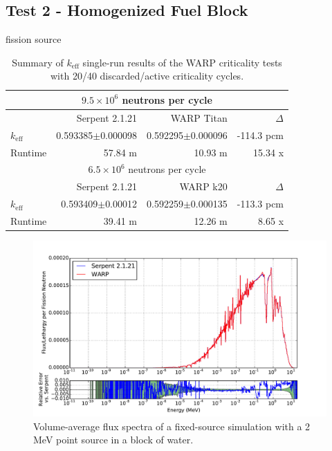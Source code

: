 \documentclass[preprint,12pt]{elsarticle}
\begin{document}
\subsection{Test 2 - Homogenized Fuel Block}

fission source

\begin{table}[h]
\centering
\caption{Summary of $k_\mathrm{eff}$ single-run results of the WARP criticality tests with 20/40 discarded/active criticality cycles.}
\label{homfuel_table}
\small
\begin{tabular}{| l | r | r | r |}
\hline
\multicolumn{4}{|c|}{$9.5\times10^6$ neutrons per cycle} \\
\hline
                  & Serpent 2.1.21         & WARP Titan               & $\Delta$ \\
\hline
$k_\mathrm{eff}$  & 0.593385$\pm$0.000098  & 0.592295$\pm$0.000096         & -114.3 pcm \\
\hline
Runtime           & 57.84 m               & 10.93 m                  & 15.34 x \\
\hline
\hline
\multicolumn{4}{|c|}{$6.5\times10^6$ neutrons per cycle} \\
\hline
                  & Serpent 2.1.21       & WARP k20            & $\Delta$ \\
\hline
$k_\mathrm{eff}$  & 0.593409$\pm$0.00012 & 0.592259$\pm$0.000135     & -113.3 pcm \\
\hline
Runtime           & 39.41 m             & 12.26 m             & 8.65 x\\
\hline
\end{tabular}
\end{table}


\begin{figure}[h!]
\centering
\includegraphics[width=\textwidth,trim= 1cm 0cm 1cm 0cm]{graphics/homfuel_spec.pdf}
\caption{Volume-average flux spectra of a fixed-source simulation with a 2 MeV point source in a block of water. \label{homfuel_spec} }
\end{figure}
\end{document}
